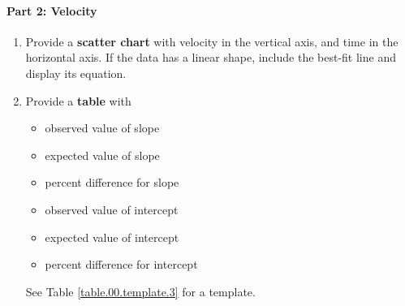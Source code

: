 \paragraph{Part 2: Velocity}
%
\begin{enumerate}
    \item Provide a \textbf{scatter chart} with velocity in the vertical axis, and time in the horizontal axis. If the data has a linear shape, include the best-fit line and display its equation.
    \item Provide a \textbf{table} with
    \begin{itemize}
        \item observed value of slope
        \item expected value of slope
        \item percent difference for slope
        \item observed value of intercept
        \item expected value of intercept
        \item percent difference for intercept
    \end{itemize}
    See Table \ref{table.00.template.3} for a template.
\end{enumerate}
%

